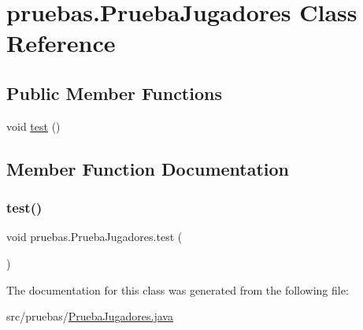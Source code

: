 \hypertarget{classpruebas_1_1_prueba_jugadores}{}\section{pruebas.\+Prueba\+Jugadores Class Reference}
\label{classpruebas_1_1_prueba_jugadores}
\subsection*{Public Member Functions}
\begin{DoxyCompactItemize}
\item 
void \hyperlink{classpruebas_1_1_prueba_jugadores_a552aeecc9a0489bcf6604300677caf93}{test} ()
\end{DoxyCompactItemize}


\subsection{Member Function Documentation}
\hypertarget{classpruebas_1_1_prueba_jugadores_a552aeecc9a0489bcf6604300677caf93}{}\label{classpruebas_1_1_prueba_jugadores_a552aeecc9a0489bcf6604300677caf93} 
\subsubsection{\texorpdfstring{test()}{test()}}
{\footnotesize\ttfamily void pruebas.\+Prueba\+Jugadores.\+test (\begin{DoxyParamCaption}{ }\end{DoxyParamCaption})}



The documentation for this class was generated from the following file\+:\begin{DoxyCompactItemize}
\item 
src/pruebas/\hyperlink{_prueba_jugadores_8java}{Prueba\+Jugadores.\+java}\end{DoxyCompactItemize}
